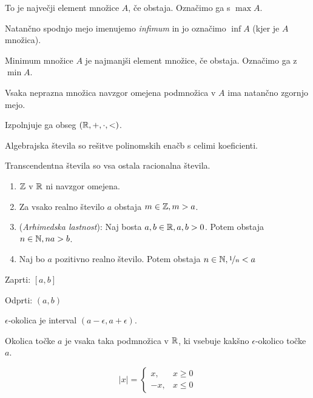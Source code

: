 To je največji element množice $A$, če obstaja. Označimo ga s $\max A$.


Natančno spodnjo mejo imenujemo \textit{infimum} in jo označimo $\inf A$ (kjer je $A$ množica).

Minimum množice $A$ je najmanjši element množice, če obstaja. Označimo ga z $\min A$.


Vsaka neprazna množica navzgor omejena podmnožica v $A$ ima natančno zgornjo mejo.

Izpolnjuje ga obseg $(\mathbb{R}, +, \cdot, <)$.


Algebrajska števila so rešitve polinomskih enačb s celimi koeficienti.

Transcendentna števila so vsa ostala racionalna števila.


\begin{enumerate}
	\item $\mathbb{Z}$ v $\mathbb{R}$ ni navzgor omejena.
	\item Za vsako realno število $a$ obstaja $m \in \mathbb{Z}, m > a$.
	\item (\textit{Arhimedska lastnost}): Naj bosta $a, b \in \mathbb{R}, a, b > 0$. Potem obstaja $n \in \mathbb{N}, na > b$.
	\item Naj bo $a$ pozitivno realno število. Potem obstaja $n \in \mathbb{N}, \nicefrac{1}{n} < a$
\end{enumerate}


Zaprti: $[a, b]$

Odprti: $(a, b)$


$\epsilon$-okolica je interval $(a-\epsilon, a+\epsilon)$.

Okolica točke $a$ je vsaka taka podmnožica v $\mathbb{R}$, ki vsebuje kakšno $\epsilon$-okolico točke $a$.


\[
	\left|x\right| = \begin{cases}
		x, & x \ge 0\\
		-x, & x \le 0
	\end{cases}
\]


